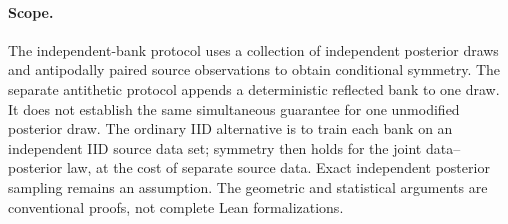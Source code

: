 \documentclass[11pt]{article}
\begin{document}
\paragraph{Scope.}
The independent-bank protocol uses a collection of independent
posterior draws and antipodally paired source observations to obtain
conditional symmetry. The separate antithetic protocol appends a
deterministic reflected bank to one draw. It does not establish the same simultaneous
guarantee for one unmodified posterior draw. The ordinary IID alternative
is to train each bank on an independent IID source data set; symmetry
then holds for the joint data--posterior law, at the cost of separate
source data. Exact independent posterior sampling remains an assumption.
The geometric and statistical arguments are conventional proofs, not
complete Lean formalizations.
\end{document}
